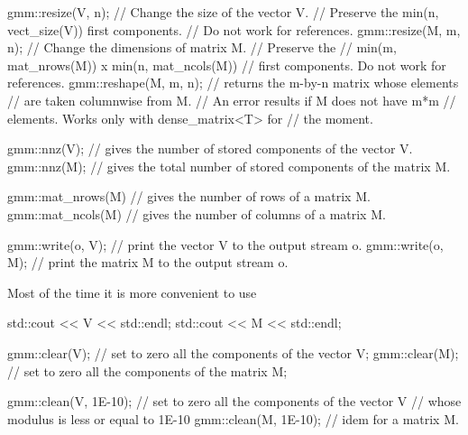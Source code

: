 \documentclass[11pt,a4paper]{article}
\begin{document}
\begin{cppcode}
  gmm::resize(V, n); // Change the size of the vector V.
                     // Preserve the min(n, vect_size(V)) first components.
                     // Do not work for references.
  gmm::resize(M, m, n); // Change the dimensions of matrix M.
                        // Preserve the
                        // min(m, mat_nrows(M)) x min(n, mat_ncols(M))
                        // first components. Do not work for references.
  gmm::reshape(M, m, n);  // returns the m-by-n matrix whose elements
                          // are taken columnwise from M.
                          // An error results if M does not have m*m
                          // elements. Works only with dense_matrix<T> for
                          // the moment.
\end{cppcode}

\begin{cppcode}
  gmm::nnz(V); // gives the number of stored components of the vector V.
  gmm::nnz(M); // gives the total number of stored components of the matrix M.
\end{cppcode}



\begin{cppcode}
  gmm::mat_nrows(M) // gives the number of rows of a matrix M.
  gmm::mat_ncols(M) // gives the number of columns of a matrix M.
\end{cppcode}

\begin{cppcode}
  gmm::write(o, V); // print the vector V to the output stream o.
  gmm::write(o, M); // print the matrix M to the output stream o.
\end{cppcode}
Most of the time it is more convenient to use
\begin{cppcode}
  std::cout << V << std::endl;
  std::cout << M << std::endl;
\end{cppcode}

\begin{cppcode}
  gmm::clear(V); // set to zero all the components of the vector V;
  gmm::clear(M); // set to zero all the components of the matrix M;
\end{cppcode}

\begin{cppcode}
  gmm::clean(V, 1E-10); // set to zero all the components of the vector V
                        // whose modulus is less or equal to 1E-10
  gmm::clean(M, 1E-10); // idem for a matrix M.
\end{cppcode}
\end{document}
